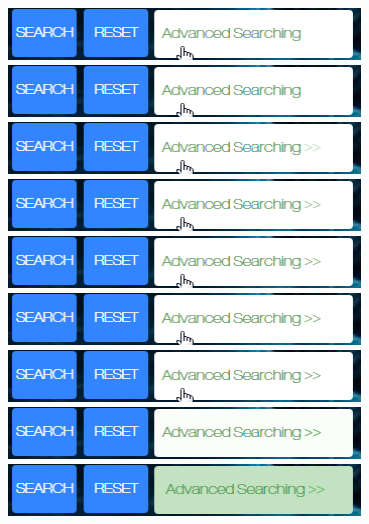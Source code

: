 \documentclass[10pt,twoside,a4paper,titlepage]{article}
\begin{document}
	\newline	\includegraphics[width=0.7\textwidth]{cyf/Advanced_searching13.png}
	\newline	\includegraphics[width=0.7\textwidth]{cyf/Advanced_searching14.png}
	\newline	\includegraphics[width=0.7\textwidth]{cyf/Advanced_searching15.png}
	\newline	\includegraphics[width=0.7\textwidth]{cyf/Advanced_searching16.png}
	\newline	\includegraphics[width=0.7\textwidth]{cyf/Advanced_searching17.png}
	\newline	\includegraphics[width=0.7\textwidth]{cyf/Advanced_searching18.png}
	\newline	\includegraphics[width=0.7\textwidth]{cyf/Advanced_searching19.png}
	\newline	\includegraphics[width=0.7\textwidth]{cyf/Advanced_searching20.png}
	\newline	\includegraphics[width=0.7\textwidth]{cyf/Advanced_searching21.png}
\end{document}
